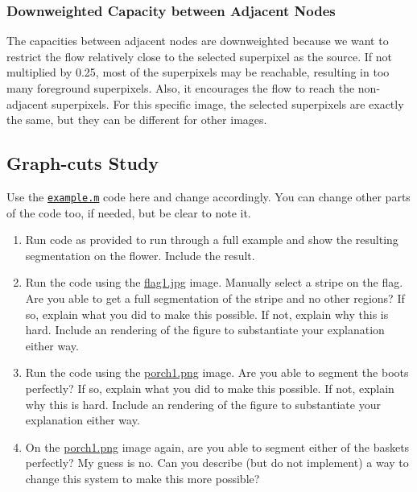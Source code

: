 \subsubsection{Downweighted Capacity between Adjacent Nodes}
The capacities between adjacent nodes are downweighted because we want to restrict the flow relatively close to the selected superpixel as the source.
If not multiplied by 0.25, most of the superpixels may be reachable, resulting in too many foreground superpixels.
Also, it encourages the flow to reach the non-adjacent superpixels.
For this specific image, the selected superpixels are exactly the same, but they can be different for other images.


\subsection{Graph-cuts Study}
Use the \href{./hw5/example.m}{\texttt{example.m}} code here and change accordingly.
You can change other parts of the code too, if needed, but be clear to note
it.
\begin{enumerate}
    \item Run code as provided to run through a full example and show the resulting segmentation on the flower.
    Include the result.
    \item Run the code using the \href{./hw5/flag1.jpg}{flag1.jpg} image.
    Manually select a stripe on the flag.
    Are you able to get a full segmentation of the stripe and no other regions?
    If so, explain what you did to make this possible.
    If not, explain why this is hard.
    Include an rendering of the figure to substantiate your explanation either way.
    \item Run the code using the \href{./hw5/porch1.png}{porch1.png} image.
    Are you able to segment the boots perfectly?
    If so, explain what you did to make this possible.
    If not, explain why this is hard.
    Include an rendering of the figure to substantiate your explanation either way.
    \item On the \href{./hw5/porch1.png}{porch1.png} image again, are you able to segment either of the baskets perfectly?
    My guess is no.
    Can you describe (but do not implement) a way to change this system to make this more possible?
\end{enumerate}

